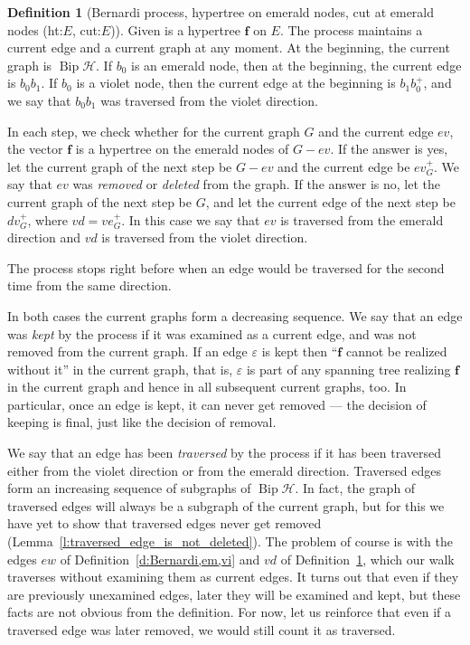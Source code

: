 \documentclass[10pt]{amsart}
\theoremstyle{definition}\newtheorem{defi}[theo]{Definition}
\theoremstyle{remark}\newtheorem{rema}[theo]{Remark}
\newcommand{\HH}{\mathcal H}
\DeclareMathOperator{\bip}{Bip}
\begin{document}
\begin{defi}[Bernardi process, hypertree on emerald nodes, cut at emerald nodes (ht:$E$, cut:$E$)]
\label{d:Bernardi,vi,vi}
Given is a hypertree $\mathbf f$ on $E$. The process maintains a current edge and a current graph at any moment. At the beginning, the current graph is $\bip \HH$. If $b_0$ is an emerald node, then at the beginning, the current edge is $b_0b_1$. If $b_0$ is a violet node, then the current edge at the beginning is $b_1b_0^+$, and we say that $b_0b_1$ was traversed from the violet direction.

In each step, we check whether for the current graph $G$ and the current edge $ev$, the vector $\mathbf f$ is a hypertree on the emerald nodes of $G-ev$. If the answer is yes, let the current graph of the next step be $G-ev$ and the current edge be $ev_G^+$. We say that $ev$ was \emph{removed} or \emph{deleted} from the graph. If the answer is no, let the current graph of the next step be $G$, and let the current edge of the next step be $dv_G^+$, where $vd = ve_G^+$. In this case we say that $ev$ is traversed from the emerald direction and $vd$ is traversed from the violet direction.

The process stops right before when an edge would be traversed for the second time from the same direction.
\end{defi}

In both cases the current graphs form a decreasing sequence. We say that an edge was \emph{kept} by the process if it was examined as a current edge, and was not removed from the current graph. If an edge $\varepsilon$ is kept then ``$\mathbf f$ cannot be realized without it'' in the current graph, that is, $\varepsilon$ is part of any spanning tree realizing $\mathbf f$ in the current graph and hence in all subsequent current graphs, too. In particular, once an edge is kept, it can never get removed --- the decision of keeping is final, just like the decision of removal.

We say that an edge has been \emph{traversed} by the process if it has been traversed either from the violet direction or from the emerald direction. Traversed edges form an increasing sequence of subgraphs of $\bip\HH$. In fact, the graph of traversed edges will always be a subgraph of the current graph, but for this we have yet to show that traversed edges never get removed (\cf Lemma~\ref{l:traversed_edge_is_not_deleted}). The problem of course is with the edges $ew$ of Definition~\ref{d:Bernardi,em,vi} and $vd$ of Definition~\ref{d:Bernardi,vi,vi}, which our walk traverses without examining them as current edges. It turns out that even if they are previously unexamined edges, later they will be examined and kept, but these facts are not obvious from the definition. For now, let us reinforce that even if a traversed edge was later removed, we would still count it as traversed.
\end{document}
